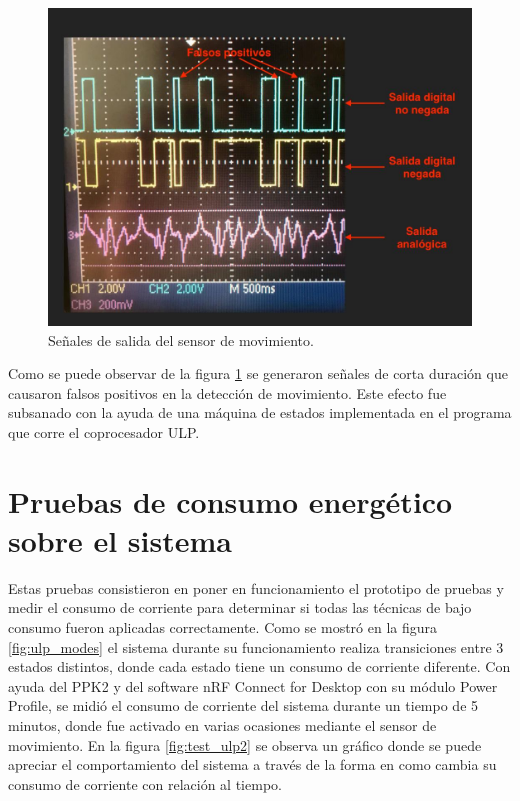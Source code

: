 \begin{figure}[h]
	\centering
	\includegraphics[scale=0.35]{./Figures/test_pir.jpeg}
	\caption{Señales de salida del sensor de movimiento.}
	\label{fig:test_pir}
\end{figure}

Como se puede observar de la figura \ref{fig:test_pir} se generaron señales de corta duración que causaron falsos positivos en la detección de movimiento. Este efecto fue subsanado con la ayuda de una máquina de estados implementada en el programa que corre el coprocesador ULP.

\section{Pruebas de consumo energético sobre el sistema}
Estas pruebas consistieron en poner en funcionamiento el prototipo de pruebas y medir el consumo de corriente para determinar si todas las técnicas de bajo consumo fueron aplicadas correctamente. Como se mostró en la figura \ref{fig:ulp_modes} el sistema durante su funcionamiento realiza transiciones entre 3 estados distintos, donde cada estado tiene un consumo de corriente diferente. Con ayuda del PPK2 y del software nRF Connect for Desktop con su módulo Power Profile, se midió el consumo de corriente del sistema durante un tiempo de 5 minutos, donde fue activado en varias ocasiones mediante el sensor de movimiento. En la figura \ref{fig:test_ulp2} se observa un gráfico donde se puede apreciar el comportamiento del sistema a través de la forma en como cambia su consumo de corriente con relación al tiempo.

